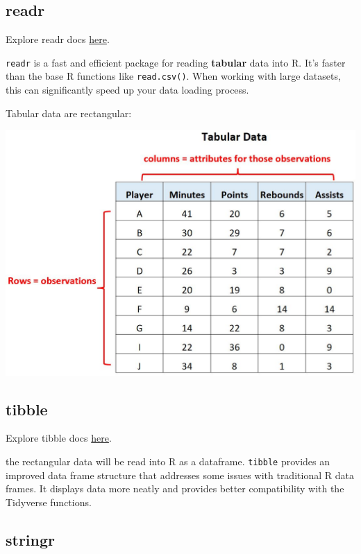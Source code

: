 \documentclass[
]{book}
\begin{document}
\hypertarget{readr}{%
\subsection{readr}\label{readr}}

Explore readr docs \href{https://readr.tidyverse.org/index.html}{here}.

\texttt{readr} is a fast and efficient package for reading \textbf{tabular} data into R. It's faster than the base R functions like \texttt{read.csv()}. When working with large datasets, this can significantly speed up your data loading process.

Tabular data are rectangular:

\includegraphics{images/tabular.jpeg}

\hypertarget{tibble}{%
\subsection{tibble}\label{tibble}}

Explore tibble docs \href{https://tibble.tidyverse.org/index.html}{here}.

the rectangular data will be read into R as a dataframe. \texttt{tibble} provides an improved data frame structure that addresses some issues with traditional R data frames. It displays data more neatly and provides better compatibility with the Tidyverse functions.

\hypertarget{stringr}{%
\subsection{stringr}\label{stringr}}
\end{document}
